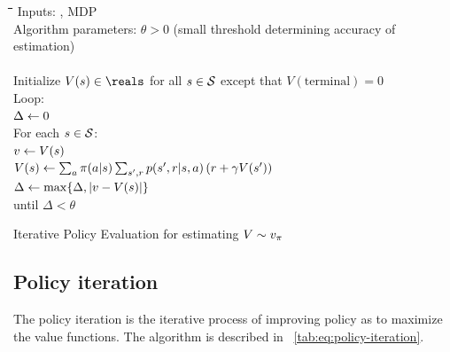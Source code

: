 \begin{table}
\begin{tabbing}
\hspace*{1cm}\=\hspace*{1cm}\=\hspace*{1cm}\=\hspace*{1cm}\=
\hspace*{1cm}\=\hspace*{1cm}\=\hspace*{1cm}\=\hspace*{1cm}\= \kill
\>Inputs: \pol, MDP \\
\>Algorithm parameters: $\theta > 0$ (small threshold determining accuracy of estimation)\\
\\
\>Initialize $V(\curs) \in \reals$ for all $s \in \mathcal{S}$ except that $V(\mathrm{terminal}) = 0$ \\
\> Loop: \\
\> \> $\Delta \leftarrow 0$ \\
\> \> For each $s\in\mathcal{S}$: \\
\> \> \> $v\leftarrow V(s)$ \\
\> \> \> $V(s) \leftarrow \sum_a \pi(a|s) \sum_{{s'}, r} p({s'}, r|s,a) \left( r + \gamma V({s'}) \right)$ \\
\> \> \> $\Delta \leftarrow \max\{\Delta, |v-V(s)|\}$ \\
\> until $\Delta < \theta$
\end{tabbing}
\caption{Iterative Policy Evaluation for estimating $V \sim v_{\pi}$}
\label{tab:alg:policy-evaluation}
\end{table}


\subsection{Policy iteration}

The policy iteration is the iterative process of improving policy as to maximize the value functions.
The algorithm is described in \tablename~\ref{tab:eq:policy-iteration}.

